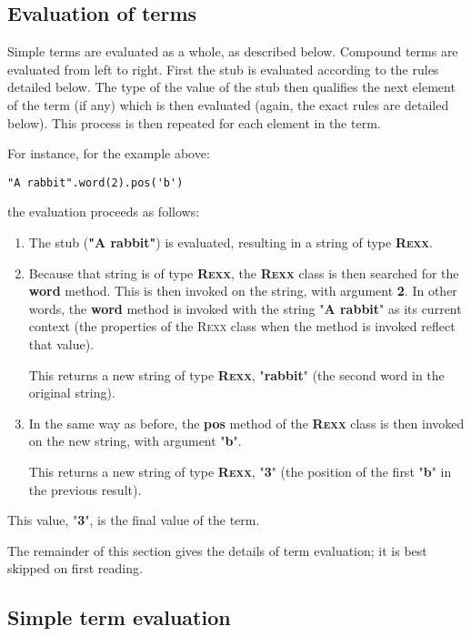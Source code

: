 \subsection{Evaluation of terms}\label{refteval}
 
Simple terms are evaluated as a whole, as described below.
Compound terms are evaluated from left to right.  First the stub is
evaluated according to the rules detailed below.
The type of the value of the stub then qualifies the next element of the
term (if any) which is then evaluated (again, the exact rules are
detailed below).
This process is then repeated for each element in the term.
 
For instance, for the example above:
\begin{lstlisting}
"A rabbit".word(2).pos('b')
\end{lstlisting}
the evaluation proceeds as follows:
\begin{enumerate}
\item The stub (\textbf{"A rabbit"}) is evaluated, resulting in a string
of type \textbf{R\textsc{exx}}.
\item 
Because that string is of type \textbf{R\textsc{exx}}, the \textbf{R\textsc{exx}} class
is then searched for the \textbf{word} method.  This is then invoked
on the string, with argument \textbf{2}.
In other words, the \textbf{word} method is invoked with the string
"\textbf{A rabbit}" as its current context (the properties of the
R\textsc{exx} class when the method is invoked reflect that value).
 
This returns a new string of type \textbf{R\textsc{exx}},
"\textbf{rabbit}" (the second word in the original string).
\item 
In the same way as before, the \textbf{pos} method of
the \textbf{R\textsc{exx}} class is then invoked on the new string, with
argument "\textbf{b}".
 
This returns a new string of type \textbf{R\textsc{exx}}, "\textbf{3}"
(the position of the first "\textbf{b}" in the previous result).
\end{enumerate}
This value, "\textbf{3}", is the final value of the term.
 
The remainder of this section gives the details of term
evaluation; it is best skipped on first reading.
\subsection{Simple term evaluation}
 
